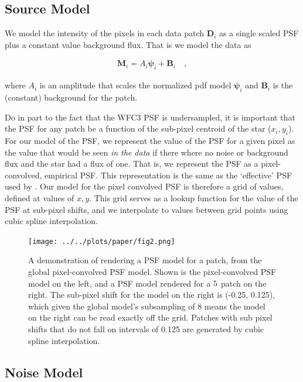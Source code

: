 \documentclass[12pt,letterpaper,preprint]{aastex}
\newcommand{\vect}[1]{\mathbf{#1}}
\newcommand{\data}{\vect{D}}
\newcommand{\model}{\vect{M}}
\newcommand{\bkg}{\vect{B}}
\newcommand{\psf}{\vect{\psi}}
\begin{document}
\subsection{Source Model}
\label{ssec:model}

We model the intensity of the pixels in each data patch $\data_i$ as a single scaled PSF plus a constant value 
background flux.  That is we model the data as 

\begin{eqnarray}
\model_i =  A_i \psf_i + \bkg_i
\quad , 
\label{eqn:model-patch}
\end{eqnarray}

\noindent where $A_i$ is an amplitude that scales the normalized pdf model $\psf_i$ and $\bkg_i$ is 
the (constant) background for the patch.  

Do in part to the fact that the WFC3 PSF is undersampled,  it 
is important that the PSF for any patch be a function of the sub-pixel centroid of the star ($x_i, y_i$).  For 
our model of the PSF, we represent the value of the PSF for a given pixel as the value that would be 
seen \emph{in the data} if there where no noise or background flux and the star had a flux of one.  That 
is, we represent the PSF as a pixel-convolved, empirical PSF.  This representation is the same as the
 `effective' PSF used by \citet{anderson06}.  Our model for the pixel convolved PSF is therefore a grid 
 of values, defined at values of $x, y$.  This grid serves as a lookup function for the value of the PSF 
 at sub-pixel shifts, and we interpolate to values between grid points using cubic spline interpolation.

\begin{figure}
\centering
 \texttt{[image: ../../plots/paper/fig2.png]}
\caption{A demonstration of rendering a PSF model for a patch, from the global pixel-convolved PSF 
model.  Shown is the pixel-convolved PSF model on the left, and a PSF model rendered for a $5\time5$
patch on the right.  The sub-pixel shift for the model on the right is (-0.25, 0.125), which given the global 
model's subsampling of 8 means the model on the right can be read exactly off the grid.  Patches with 
sub pixel shifts that do not fall on intervals of 0.125 are generated by cubic spline interpolation.}
\label{fig:psf-generation}
\end{figure}


\subsection{Noise Model}
\label{ssec:noise}
\end{document}
